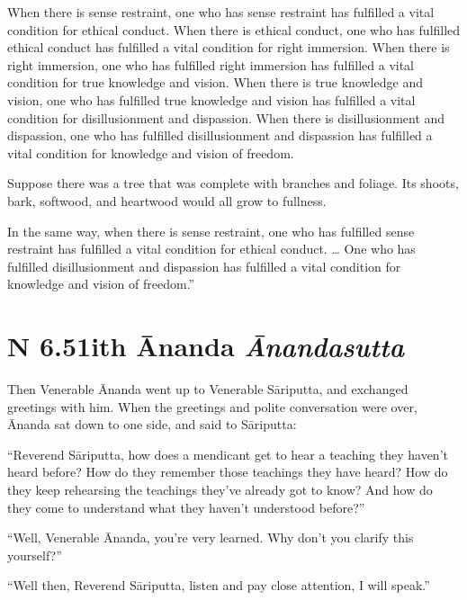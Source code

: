 \documentclass[12pt,openany]{book}%
\newcommand*{\suttatitleacronym}[1]{\smaller[2]{#1}\vspace*{.3em}}
\newcommand*{\suttatitletranslation}[1]{\linebreak{#1}}
\newcommand*{\suttatitleroot}[1]{\linebreak\smaller[2]\itshape{#1}}
\newcommand*{\tocacronym}[1]{\hspace*{-3.3em}{#1}\quad}
\newcommand*{\toctranslation}[1]{#1}
\newcommand*{\tocroot}[1]{(\textit{#1})}
\begin{document}
When there is sense restraint, one who has sense restraint has fulfilled a vital condition for ethical conduct. When there is ethical conduct, one who has fulfilled ethical conduct has fulfilled a vital condition for right immersion. When there is right immersion, one who has fulfilled right immersion has fulfilled a vital condition for true knowledge and vision. When there is true knowledge and vision, one who has fulfilled true knowledge and vision has fulfilled a vital condition for disillusionment and dispassion. When there is disillusionment and dispassion, one who has fulfilled disillusionment and dispassion has fulfilled a vital condition for knowledge and vision of freedom. 

Suppose there was a tree that was complete with branches and foliage. Its shoots, bark, softwood, and heartwood would all grow to fullness. 

In the same way, when there is sense restraint, one who has fulfilled sense restraint has fulfilled a vital condition for ethical conduct. … One who has fulfilled disillusionment and dispassion has fulfilled a vital condition for knowledge and vision of freedom.” 

%
\section*{{\suttatitleacronym AN 6.51}{\suttatitletranslation With Ānanda }{\suttatitleroot Ānandasutta}}
\addcontentsline{toc}{section}{\tocacronym{AN 6.51} \toctranslation{With Ānanda } \tocroot{Ānandasutta}}

Then Venerable Ānanda went up to Venerable \textsanskrit{Sāriputta}, and exchanged greetings with him. When the greetings and polite conversation were over, Ānanda sat down to one side, and said to \textsanskrit{Sāriputta}: 

“Reverend \textsanskrit{Sāriputta}, how does a mendicant get to hear a teaching they haven’t heard before? How do they remember those teachings they have heard? How do they keep rehearsing the teachings they’ve already got to know? And how do they come to understand what they haven’t understood before?” 

“Well, Venerable Ānanda, you’re very learned. Why don’t you clarify this yourself?” 

“Well then, Reverend \textsanskrit{Sāriputta}, listen and pay close attention, I will speak.” 
\end{document}
